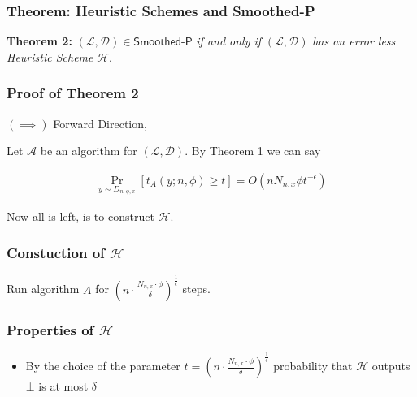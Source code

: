 \begin{frame}
    \frametitle{Theorem: Heuristic Schemes and \textsf{Smoothed-P}}

    \textbf{Theorem 2:} $(\mathcal{L}, \mathcal{D}) \in \textsf{Smoothed-P}$ \textit{if and only if} $(\mathcal{L}, \mathcal{D})$ \textit{has an error less Heuristic Scheme} $\mathcal{H}$.

\end{frame}

\begin{frame}
    \frametitle{Proof of Theorem 2}

    $(\implies)$ Forward Direction,

    Let $\mathcal{A}$ be an algorithm for $(\mathcal{L}, \mathcal{D})$. By Theorem
    1 we can say

    \begin{align*}
        \Pr_{y \sim D_{n, \phi, x}}[t_A(y;n, \phi) \geq t] = O(n N_{n,x} \phi t^{-\epsilon})
    \end{align*}

    Now all is left, is to construct $\mathcal{H}$.
\end{frame}

\begin{frame}
    \frametitle{Constuction of $\mathcal{H}$}

    \begin{algorithm}[H]
        \caption{$\mathcal{H}$}

        Run algorithm $A$ for $(n \cdot \frac{N_{n, x} \cdot \phi}{\delta})
            ^{\frac{1}{\epsilon}}$ steps.\\  
    \end{algorithm}

\end{frame}

\begin{frame}
    \frametitle{Properties of $\mathcal{H}$}

    \begin{itemize}
        \item By the choice of the parameter $t = (n \cdot \frac{N_{n, x} \cdot
                      \phi}{\delta}) ^{\frac{1}{\epsilon}}$ probability that $\mathcal{H}$ outputs
              $\bot$ is at most $\delta$
    \end{itemize}

\end{frame}

